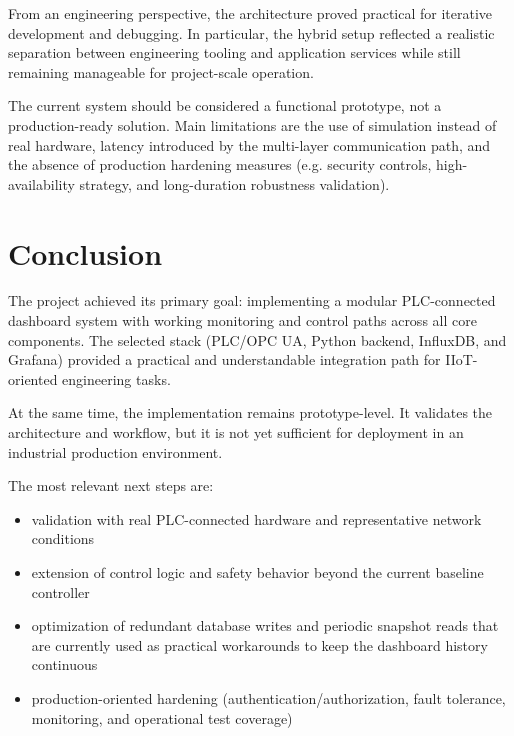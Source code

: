 \documentclass[a4paper,11pt]{article}
\begin{document}
From an engineering perspective, the architecture proved practical for iterative development and
debugging. In particular, the hybrid setup reflected a realistic separation between engineering
tooling and application services while still remaining manageable for project-scale operation.

The current system should be considered a functional prototype, not a production-ready solution.
Main limitations are the use of simulation instead of real hardware, latency introduced by the
multi-layer communication path, and the absence of production hardening measures (e.g.
security controls, high-availability strategy, and long-duration robustness validation).

\section{Conclusion}

The project achieved its primary goal: implementing a modular PLC-connected dashboard system with
working monitoring and control paths across all core components. The selected stack (PLC/OPC UA,
Python backend, InfluxDB, and Grafana) provided a practical and understandable integration path
for IIoT-oriented engineering tasks.

At the same time, the implementation remains prototype-level. It validates the architecture and
workflow, but it is not yet sufficient for deployment in an industrial production environment.

The most relevant next steps are:

\begin{itemize}
    \item validation with real PLC-connected hardware and representative network conditions
    \item extension of control logic and safety behavior beyond the current baseline controller
    \item optimization of redundant database writes and periodic snapshot reads that are currently
    used as practical workarounds to keep the dashboard history continuous
    \item production-oriented hardening (authentication/authorization, fault tolerance, monitoring,
    and operational test coverage)
\end{itemize}
\end{document}
